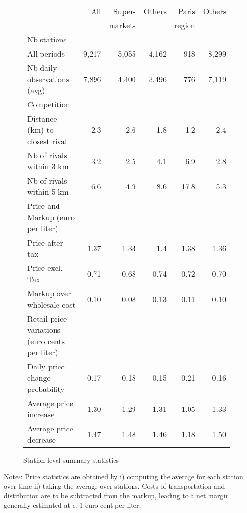 \documentclass[english]{article}
\begin{document}
\begin{figure}[!h]
  \caption{Station-level summary statistics}
\begin{tabular}{lr|rr|rr}
    \hline
    \hline
		{}          & All   & Super-   & Others & Paris  & Others \\
    {}          &       & markets  &        & region & \\
    \hline
    Nb stations &       &       &       &       &  \\
    All periods & 9,217 & 5,055  & 4,162  & 918   & 8,299 \\
    Nb daily observations (avg) & 7,896  & 4,400  & 3,496  & 776   & 7,119 \\
		\hline
    Competition &       &       &       &       &  \\
    Distance (km) to closest rival & 2.3  & 2.6  & 1.8  & 1.2  & 2.4 \\
    Nb of rivals within 3 km       & 3.2  & 2.5  & 4.1  & 6.9  & 2.8 \\
    Nb of rivals within 5 km       & 6.6  & 4.9  & 8.6  & 17.8 & 5.3 \\
    \hline
    Price and Markup (euro per liter) &       &       &       &       &  \\
    Price after tax            & 1.37  & 1.33  & 1.4   & 1.38  & 1.36 \\
    Price excl. Tax            & 0.71  & 0.68  & 0.74  & 0.72  & 0.70 \\
    Markup over wholesale cost & 0.10  & 0.08  & 0.13  & 0.11  & 0.10 \\
    \hline
    Retail price variations (euro cents per liter) &       &       &       &       &  \\
    Daily price change probability & 0.17  & 0.18  & 0.15  & 0.21  & 0.16 \\
    Average price increase         & 1.30   & 1.29  & 1.31  & 1.05  & 1.33 \\
    Average price decrease         & 1.47   & 1.48  & 1.46  & 1.18  & 1.50 \\
    \hline
    \hline
\end{tabular}
\label{tab:station_stats_des}
\end{figure}

Notes: Price statistics are obtained by i) computing the average for each station over time ii) taking the average over stations. Costs of transportation and distribution are to be subtracted from the markup, leading to a net margin generally estimated at c. 1 euro cent per liter.
\end{document}
